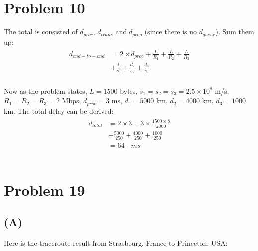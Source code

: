 \documentclass[titlepage, paper=a4, fontsize=11pt]{scrartcl} %
\numberwithin{equation}{section} %
\numberwithin{figure}{section} %
\numberwithin{table}{section} %
\begin{document}

\section*{Problem 10}
The total is consisted of $d_{proc}$, $d_{trans}$ and $d_{prop}$ (since there is no $d_{queue}$). Sum them up:
\begin{align*} 
\begin{split}
d_{end-to-end} &= 2 \times d_{proc} + \frac{L}{R_1} + \frac{L}{R_2} + \frac{L}{R_3} \\
&+ \frac{d_1}{s_1} + \frac{d_2}{s_2} + \frac{d_3}{s_3}
\end{split}					
\end{align*}
\\
Now as the problem states, $L = 1500$ bytes, $s_1 = s_2 = s_3 = 2.5 \times 10^8$ m/s,
$R_1 = R_2 = R_3 = 2$ Mbps, $d_{proc} = 3$ ms, $d_1 = 5000$ km, $d_2 = 4000$ km, $d_3 = 1000$ km.
The total delay can be derived:
\begin{align*} 
\begin{split}
d_{total} &= 2 \times 3 + 3 \times \frac{1500 \times 8}{2000} \\
&+ \frac{5000}{250} + \frac{4000}{250} + \frac{1000}{250}\\
&= 64 \quad ms
\end{split}					
\end{align*}
\\



\section*{Problem 19}
\subsection*{(A)}
Here is the traceroute result from Strasbourg, France to Princeton, USA: \\
\end{document}
